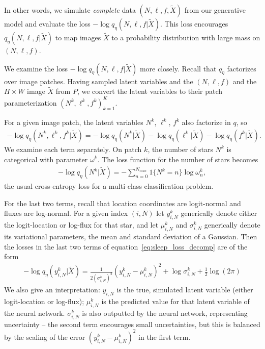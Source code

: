 In other words, we simulate {\itshape complete} data $(N, \ell, f, \tilde X)$ from our generative model and evaluate the loss $-\log q_\eta(N, \ell, f | \tilde X)$. 
This loss encourages $q_{\eta}(N, \ell, f | \tilde X)$ to map images $\tilde X$ to a probability distribution with large mass on $(N, \ell, f)$.

We examine the loss $-\log q_\eta(N, \ell, f | \tilde X)$ more closely. Recall that $q_\eta$ factorizes over image patches. Having sampled latent variables and the $(N,\ell,f)$ and the $H\times W$ image $\tilde X$ from $P$, we convert the latent variables to their patch parameterization $(N^k, \ell^k, f^k)_{k = 1}^K$. 

For a given image patch, the latent variables $N^k$, $\ell^k$, $f^k$ also factorize in $q$, so 
\begin{align}
    - \log q_\eta(N^k, \ell^k, f^k | \tilde X) = 
        - \log q_\eta(N^k | \tilde X) 
        - \log q_\eta(\ell^k | \tilde X) 
        - \log q_\eta(f^k | \tilde X). 
        \label{eq:sleep_loss_decomp}
\end{align}
We examine each term separately. On patch $k$, the number of stars $N^k$ is categorical with parameter $\omega^k$. The loss function for the number of stars becomes
\begin{align}
    - \log q_\eta(N^k | \tilde X) = -\sum_{n = 0}^{N_{max}} 1\{N^k = n\} \log \omega^k_n, 
\end{align}
the usual cross-entropy loss for a multi-class classification problem. 

For the last two terms, recall that location coordinates are logit-normal and fluxes are log-normal. For a given index $(i, N)$ let $y^k_{i,N}$ generically denote either the 
logit-location or log-flux for that star, 
and let $\mu^k_{i,N}$ and $\sigma^{k}_{i,N}$ generically denote its variational parameters,
the mean and standard deviation of a Gaussian. Then the losses in the last two terms of equation~\ref{eq:sleep_loss_decomp} are of the form 
\begin{align}
    -\log q_\eta(y^k_{i,N} | \tilde X) = 
        \frac{1}{2(\sigma^{k}_{i,N})^2}(y^k_{i,N} - \mu^k_{i,N})^2
         + \log\sigma^{k}_{i,N}
         + \frac{1}{2}\log(2\pi)
\end{align}
We also give an interpretation: $y_{i,N}$ is the true, simulated latent variable (either logit-location or log-flux); $\mu^k_{i,N}$ is the predicted value for that latent variable of the neural network. $\sigma^{k}_{i,N}$ is also outputted by the neural network, representing uncertainty -- the second term encourages small uncertainties, but this is 
balanced by the scaling of the error $(y^k_{i,N} - \mu^k_{i,N})^2$ in the first term. 


